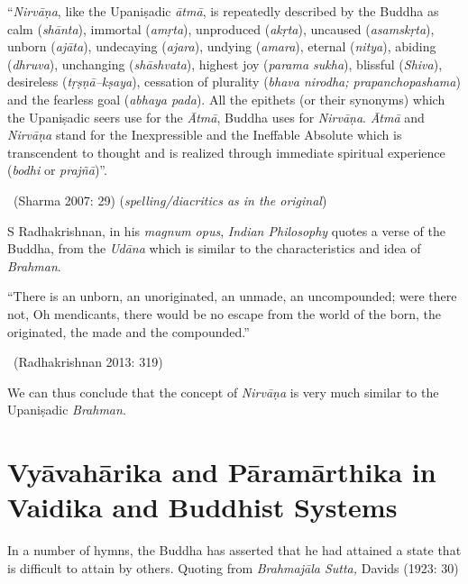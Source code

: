 \begin{myquote}
“\textit{Nirvāṇa}, like the Upaniṣadic \textit{ātmā}, is repeatedly described by the Buddha as calm (\textit{shānta}), immortal (\textit{amṛta}), unproduced (\textit{akṛta}), uncaused (\textit{asamskṛta}), unborn (\textit{ajāta}), undecaying (\textit{ajara}), undying (\textit{amara}), eternal (\textit{nitya}), abiding (\textit{dhruva}), unchanging (\textit{shāshvata}), highest joy (\textit{parama sukha}), blissful (\textit{Shiva}), desireless (\textit{tṛṣṇā–kṣaya}), cessation of plurality (\textit{bhava nirodha; prapanchopashama}) and the fearless goal (\textit{abhaya pada}). All the epithets (or their synonyms) which the Upaniṣadic seers use for the \textit{Ātmā}, Buddha uses for \textit{Nirvāṇa}. \textit{Ātmā} and \textit{Nirvāṇa} stand for the Inexpressible and the Ineffable Absolute which is transcendent to thought and is realized through immediate spiritual experience (\textit{bodhi} or \textit{prajñā})”. 

~\hfill (Sharma 2007: 29) (\textit{spelling/diacritics as in the original})
\end{myquote}

S Radhakrishnan, in his \textit{magnum opus}, \textit{Indian Philosophy} quotes a verse of the Buddha, from the \textit{Udāna} which is similar to the characteristics and idea of \textit{Brahman}.

\begin{myquote}
“There is an unborn, an unoriginated, an unmade, an uncompounded; were there not, Oh mendicants, there would be no escape from the world of the born, the originated, the made and the compounded.” 

~\hfill (Radhakrishnan 2013: 319)
\end{myquote}

We can thus conclude that the concept of \textit{Nirvāṇa} is very much similar to the Upaniṣadic \textit{Brahman}.


\section*{Vyāvahārika and Pāramārthika in Vaidika and Buddhist Systems}

In a number of hymns, the Buddha has asserted that he had attained a state that is difficult to attain by others. Quoting from \textit{Brahmajāla Sutta,} Davids (1923: 30)

